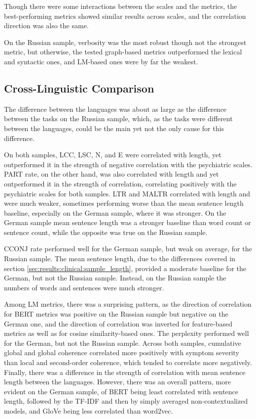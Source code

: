 \clearpage
Though there were some interactions between the scales and the metrics, the best-performing metrics showed similar results across scales, and the correlation direction was also the same.

On the Russian sample, verbosity was the most robust though not the strongest metric, but otherwise, the tested graph-based metrics outperformed the lexical and syntactic ones, and LM-based ones were by far the weakest.

\subsection{Cross-Linguistic Comparison}
\label{sec:results:clinical:cross_linguistic}

The difference between the languages was about as large as the difference between the tasks on the Russian sample, which, as the tasks were different between the languages, could be the main yet not the only cause for this difference. 

On both samples, LCC, LSC, N, and E were correlated with length, yet outperformed it in the strength of negative correlation with the psychiatric scales. PART rate, on the other hand, was also correlated with length and yet outperformed it in the strength of correlation, correlating positively with the psychiatric scales for both samples. LTR and MALTR correlated with length and were much weaker, sometimes performing worse than the mean sentence length baseline, especially on the German sample, where it was stronger. On the German sample mean sentence length was a stronger baseline than word count or sentence count, while the opposite was true on the Russian sample.

CCONJ rate performed well for the German sample, but weak on average, for the Russian sample. The mean sentence length, due to the differences covered in section \ref{sec:results:clinical:sample_length}, provided a moderate baseline for the German, but not the Russian sample. Instead, on the Russian sample the numbers of words and sentences were much stronger.

Among LM metrics, there was a surprising pattern, as the direction of correlation for BERT metrics was positive on the Russian sample but negative on the German one, and the direction of correlation was inverted for feature-based metrics as well as for cosine similarity-based ones. The perplexity performed well for the German, but not the Russian sample. Across both samples, cumulative global and global coherence correlated more positively with symptom severity than local and second-order coherence, which tended to correlate more negatively. Finally, there was a difference in the strength of correlation with mean sentence length between the languages. However, there was an overall pattern, more evident on the German sample, of BERT being least correlated with sentence length, followed by the TF-IDF and then by simply averaged non-contextualized models, and GloVe being less correlated than word2vec.

